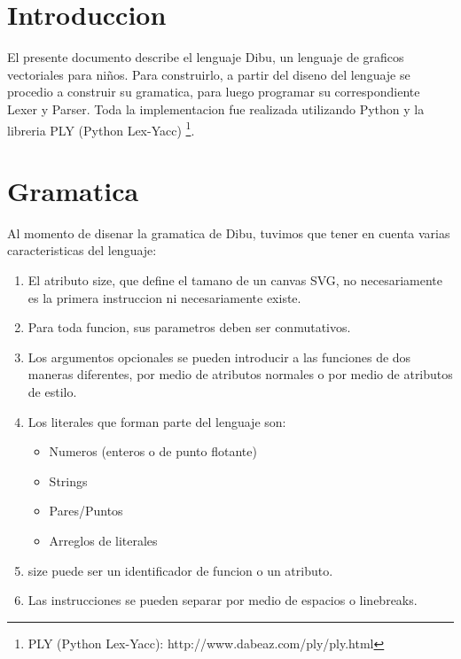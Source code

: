 \documentclass{article}
\theoremstyle{definition}
\theoremstyle{remark}
\begin{document}
{} %

 
 
\maketitle

\tableofcontents

\pagebreak

\section{Introduccion}

El presente documento describe el lenguaje Dibu, un lenguaje de graficos vectoriales para niños. Para construirlo, a partir del diseno del lenguaje se procedio a construir su gramatica, para luego programar su correspondiente Lexer y Parser. Toda la implementacion fue realizada utilizando Python y la libreria PLY (Python Lex-Yacc) \footnote{PLY (Python Lex-Yacc): http://www.dabeaz.com/ply/ply.html}.

\section{Gramatica}

Al momento de disenar la gramatica de Dibu, tuvimos que tener en cuenta varias caracteristicas del lenguaje:
\begin{enumerate}
	\item El atributo size, que define el tamano de un canvas SVG, no necesariamente es la primera instruccion ni necesariamente existe.
	\item Para toda funcion, sus parametros deben ser conmutativos.
	\item Los argumentos opcionales se pueden introducir a las funciones de dos maneras diferentes, por medio de atributos normales o por medio de atributos de estilo.
	\item Los literales que forman parte del lenguaje son:
		\begin{itemize}
			\item Numeros (enteros o de punto flotante)
			\item Strings
			\item Pares/Puntos
			\item Arreglos de literales
		\end{itemize}
	\item size puede ser un identificador de funcion o un atributo.
	\item Las instrucciones se pueden separar por medio de espacios o linebreaks.
\end{enumerate}
\end{document}
